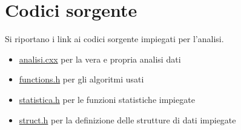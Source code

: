 \documentclass[a4paper,11pt,oneside]{article}
\begin{document}
\section{Codici sorgente}
Si riportano i link ai codici sorgente impiegati per l'analisi.
\begin{itemize}
    \item \href{https://github.com/badbigota/6_relazione/blob/master/Programmi/analisi.cxx}{analisi.cxx} per la vera e propria analisi dati 
    \item \href{https://github.com/badbigota/6_relazione/blob/master/Programmi/functions.h}{functions.h} per gli algoritmi usati
    \item \href{https://github.com/badbigota/6_relazione/blob/master/Programmi/statistica.h}{statistica.h} per le funzioni statistiche impiegate
    \item\href{https://github.com/badbigota/6_relazione/blob/master/Programmi/struct.h}{struct.h} per la definizione delle strutture di dati impiegate
\end{itemize}
\end{document}
